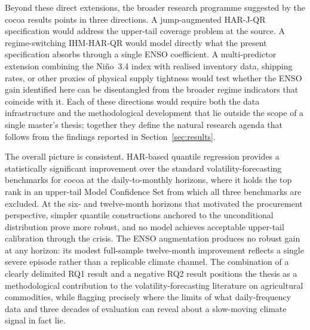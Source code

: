 Beyond these direct extensions, the broader research programme suggested by
the cocoa results points in three directions. A jump-augmented HAR-J-QR
specification would address the upper-tail coverage problem at the source.
A regime-switching IHM-HAR-QR would model directly what the present
specification absorbs through a single ENSO coefficient. A multi-predictor
extension combining the Ni\~no~3.4 index with realised inventory data,
shipping rates, or other proxies of physical supply tightness would test
whether the ENSO gain identified here can be disentangled from the broader
regime indicators that coincide with it. Each of these directions would
require both the data infrastructure and the methodological development
that lie outside the scope of a single master's thesis; together they
define the natural research agenda that follows from the findings reported
in Section~\ref{sec:results}.

The overall picture is consistent. HAR-based quantile regression provides a
statistically significant improvement over the standard
volatility-forecasting benchmarks for cocoa at the daily-to-monthly
horizons, where it holds the top rank in an upper-tail Model Confidence
Set from which all three benchmarks are excluded. At the six- and
twelve-month horizons that motivated the
procurement perspective, simpler quantile constructions anchored to the
unconditional distribution prove more robust, and no model achieves
acceptable upper-tail calibration through the crisis. The ENSO augmentation
produces no robust gain at any horizon: its modest full-sample twelve-month
improvement reflects a single severe episode rather than a replicable
climate channel. The combination of a clearly delimited RQ1 result and a
negative RQ2 result positions the thesis as a methodological contribution
to the volatility-forecasting literature on agricultural commodities, while
flagging precisely where the limits of what daily-frequency data and three
decades of evaluation can reveal about a slow-moving climate signal
in fact lie.

